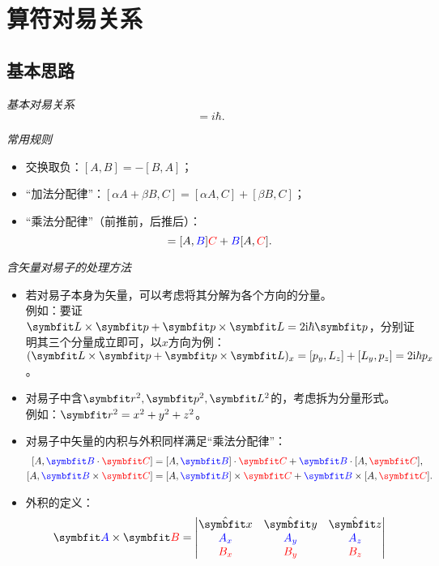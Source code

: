 \section{算符对易关系}

\subsection{基本思路}

\emph{基本对易关系}
\begin{equation}
    [x,p] = i \hbar.
\end{equation}

\emph{常用规则}
\begin{itemize}
    \item 交换取负：$[A,B] = -[B,A]$；
    \item ``加法分配律''：$[\alpha A+\beta B,C] = [\alpha A,C]+[\beta B,C]$；
    \item ``乘法分配律''（前推前，后推后）：
    \begin{equation}
        [A, \blue{B}\red{C}] = [A,\blue{B}] \red{C} + \blue{B}[A,\red{C}].
    \end{equation}
\end{itemize}

\emph{含矢量对易子的处理方法}
\begin{itemize}
    \item 若对易子本身为矢量，可以考虑将其分解为各个方向的分量。\\
    例如：要证$\LL\times\pp+\pp\times\LL = 2\ii\hbar\pp$，分别证明其三个分量成立即可，以$x$方向为例：$(\LL\times\pp+\pp\times\LL)_x = [p_y,L_z]+[L_y,p_z] = 2\ii\hbar p_x$。
    \item 对易子中含$\rr^2,\pp^2,\LL^2$的，考虑拆为分量形式。\\
    例如：$\rr^2=x^2+y^2+z^2$。
    \item 对易子中矢量的内积与外积同样满足``乘法分配律''：
    \begin{equation}
    \begin{aligned}
        \relax
        [A, \blue{\bm{B}}\cdot\red{\bm{C}}] &= [A,\blue{\bm{B}}]\cdot\red{\bm{C}} + \blue{\bm{B}}\cdot[A,\red{\bm{C}}], \\
        [A, \blue{\bm{B}}\times\red{\bm{C}}] &= [A,\blue{\bm{B}}]\times\red{\bm{C}} + \blue{\bm{B}}\times[A,\red{\bm{C}}].
    \end{aligned}
    \end{equation}
    \item 外积的定义：
    \begin{equation}
        \bm{\blue{A}}\times\bm{\red{B}} =
        \begin{vmatrix}
            \hat{\bm{x}} & \hat{\bm{y}} & \hat{\bm{z}} \\
            \blue{A_x} & \blue{A_y} & \blue{A_z} \\
            \red{B_x} & \red{B_y} & \red{B_z}
        \end{vmatrix}
    \end{equation}
\end{itemize}

